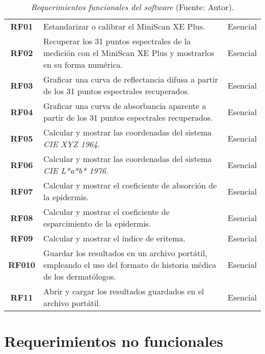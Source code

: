 	\begin{table}[h]
		\small
		\caption[Requerimientos funcionales del software]{\textit{Requerimientos funcionales del software} (Fuente: Autor).}
		\centering
		\setlength{\extrarowheight}{\altocelda}
		\begin{tabulary}{\anchotabla}{|c|J|c|}
			\hline
			 &  & \\ \hline
			
			\textbf{RF01} & Estandarizar o calibrar el MiniScan XE Plus. & Esencial\\ \hline
			
			\textbf{RF02} & Recuperar los 31 puntos espectrales de la medici\'{o}n con el MiniScan XE Plus y mostrarlos en su forma num\'{e}rica. & Esencial\\ \hline

			\textbf{RF03} & Graficar una curva de reflectancia difusa a partir de los 31 puntos espectrales recuperados. & Esencial\\ \hline
			\textbf{RF04} & Graficar una curva de absorbancia aparente a partir de los 31 puntos espectrales recuperados. & Esencial\\ \hline
			\textbf{RF05} & Calcular y mostrar las coordenadas del sistema \textit{CIE XYZ 1964}. & Esencial\\ \hline
			\textbf{RF06} & Calcular y mostrar las coordenadas del sistema \textit{CIE L*a*b* 1976}. & Esencial\\ \hline
			\textbf{RF07} & Calcular y mostrar el coeficiente de absorci\'{o}n de la epidermis. & Esencial\\ \hline
			\textbf{RF08} & Calcular y mostrar el coeficiente de esparcimiento de la epidermis. & Esencial\\ \hline
			\textbf{RF09} & Calcular y mostrar el \'{i}ndice de eritema. & Esencial\\ \hline
			\textbf{RF010} & Guardar los resultados en un archivo port\'{a}til, empleando el uso del formato de historia m\'{e}dica de los dermat\'{o}logos. & Esencial\\ \hline
			\textbf{RF11} & Abrir y cargar los resultados guardados en el archivo port\'{a}til. & Esencial\\ \hline
		\end{tabulary}
	\end{table}
	
\section{Requerimientos no funcionales}
	
